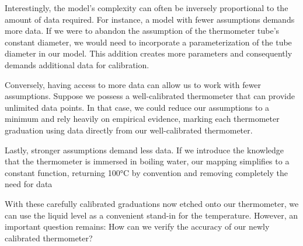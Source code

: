 \begin{bibunit}
Interestingly, the model's complexity can often be inversely proportional to the amount of data required. For instance, a model with fewer assumptions demands more data. If we were to abandon the assumption of the thermometer tube's constant diameter, we would need to incorporate a parameterization of the tube diameter in our model. This addition creates more parameters and consequently demands additional data for calibration.

Conversely, having access to more data can allow us to work with fewer assumptions. Suppose we possess a well-calibrated thermometer that can provide unlimited data points. In that case, we could reduce our assumptions to a minimum and rely heavily on empirical evidence, marking each thermometer graduation using data directly from our well-calibrated thermometer.

Lastly, stronger assumptions demand less data. If we introduce the knowledge that the thermometer is immersed in boiling water, our mapping simplifies to a constant function, returning 100°C by convention and removing completely the need for data

With these carefully calibrated graduations now etched onto our thermometer, we can use the liquid level as a convenient stand-in for the temperature. However, an important question remains: How can we verify the accuracy of our newly calibrated thermometer?


\end{bibunit}
